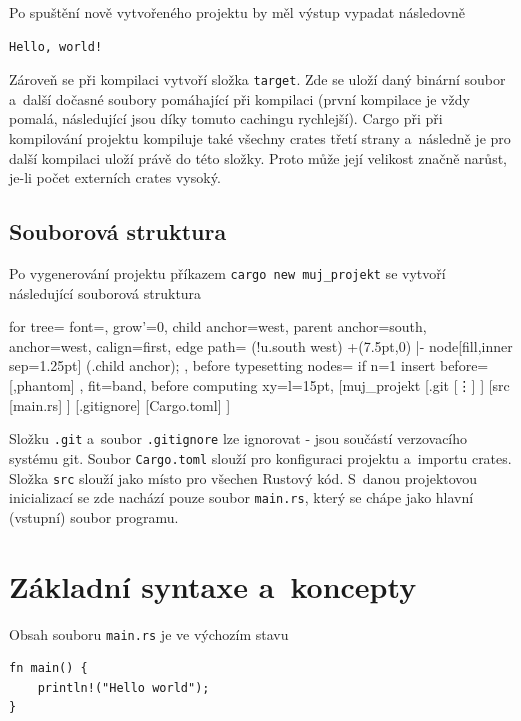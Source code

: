 \documentclass[a4paper, 12pt]{article} %
\begin{document}
				Po spuštění nově vytvořeného projektu by měl výstup vypadat následovně
				\begin{verbatim}
Hello, world!
				\end{verbatim}
	
				Zároveň se při kompilaci vytvoří složka \texttt{target}. Zde se uloží daný binární soubor a~další dočasné soubory pomáhající při kompilaci (první kompilace je vždy pomalá, následující jsou díky tomuto cachingu rychlejší). Cargo při při kompilování projektu kompiluje také všechny crates třetí strany a~následně je pro další kompilaci uloží právě do této složky. Proto může její velikost značně narůst, je-li počet externích crates vysoký.
				
		\subsection{Souborová struktura}
			Po vygenerování projektu příkazem \texttt{cargo new muj\_projekt} se vytvoří následující souborová struktura
			\begin{center}
				\begin{forest}
					for tree={
					font=\ttfamily,
					grow'=0,
					child anchor=west,
					parent anchor=south,
					anchor=west,
					calign=first,
					edge path={
						\noexpand{}
						(!u.south west) +(7.5pt,0) |- node[fill,inner sep=1.25pt] {} (.child anchor);
					},
					before typesetting nodes={
						if n=1
						{insert before={[,phantom]}}
						{}
					},
					fit=band,
					before computing xy={l=15pt},
					}
				[muj\_projekt
					[.git
					[\vdots]
					]
					[src
					[main.rs]
					]
					[.gitignore]
					[Cargo.toml]
				]
				\end{forest}
			\end{center}
		
			Složku \texttt{.git} a~soubor \texttt{.gitignore} lze ignorovat -  jsou součástí verzovacího systému git. Soubor \texttt{Cargo.toml} slouží pro konfiguraci projektu a~importu crates. Složka \texttt{src} slouží jako místo pro všechen Rustový kód. S~danou projektovou inicializací se zde nachází pouze soubor \texttt{main.rs}, který se chápe jako hlavní (vstupní) soubor programu.

\section{Základní syntaxe a~koncepty}
		Obsah souboru \texttt{main.rs} je ve výchozím stavu
		\begin{verbatim}
fn main() {
	println!("Hello world");
}
		\end{verbatim}
\end{document}

